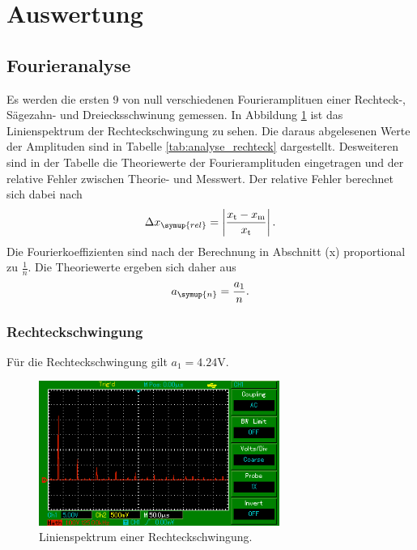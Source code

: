 \section{Auswertung}
\label{sec:Auswertung}
\subsection{Fourieranalyse}
Es werden die ersten 9 von null verschiedenen Fourieramplituen einer Rechteck-,
Sägezahn- und Dreiecksschwinung gemessen.
In Abbildung \ref{fig:linienspektrum_rechteck} ist das Linienspektrum der
Rechteckschwingung zu sehen. Die daraus abgelesenen Werte der Amplituden sind in
Tabelle \ref{tab:analyse_rechteck} dargestellt. Desweiteren sind in der Tabelle
die Theoriewerte der Fourieramplituden eingetragen und der relative Fehler
zwischen Theorie- und Messwert.
Der relative Fehler berechnet sich dabei nach
\begin{equation}
  \Delta x_\symup{rel} = \left|\frac{x_\text{t} - x_\text{m}}
  {x_\text{t}} \right|.
  \label{eqn:relativer_fehler}
\end{equation}
Die Fourierkoeffizienten sind nach der Berechnung in Abschnitt (x) proportional
zu $\frac{1}{n}$. Die Theoriewerte ergeben sich daher aus
\begin{equation}
  a_\symup{n} = \frac{a_1}{n}.
  \label{eqn:a_n_rechteck}
\end{equation}

\subsubsection{Rechteckschwingung}
Für die Rechteckschwingung gilt $a_1 = 4.24 \si{\volt}$.
\begin{figure}
  \centering
  \includegraphics[width=0.7\textwidth]{linienspektrum_rechteck.png}
  \caption{Linienspektrum einer Rechteckschwingung.}
  \label{fig:linienspektrum_rechteck}
\end{figure}

